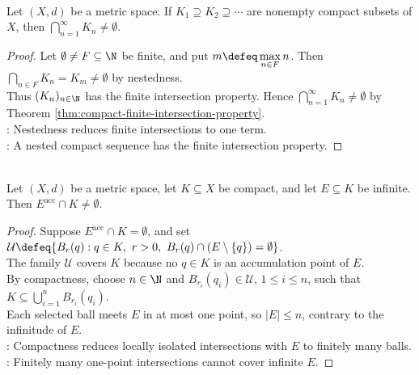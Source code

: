 \begin{corollary} \label{cor:nested-nonempty-compact-intersection} \\
Let $(X,d)$ be a metric space. If $K_1\supseteq K_2\supseteq\cdots$ are nonempty compact subsets of $X$, then $\bigcap\limits_{n=1}^{\infty}K_n\ne\emptyset$.
\begin{proof}
Let $\emptyset\ne F\subseteq\N$ be finite, and put $m\defeq\max\limits_{n\in F}n$. Then $\bigcap\limits_{n\in F}K_n=K_m\ne\emptyset$ by nestedness.\\
Thus $(K_n)_{n\in\N}$ has the finite intersection property. Hence $\bigcap\limits_{n=1}^{\infty}K_n\ne\emptyset$ by Theorem \ref{thm:compact-finite-intersection-property}.\\
: Nestedness reduces finite intersections to one term.\\
: A nested compact sequence has the finite intersection property.
\end{proof}
\end{corollary}

\begin{theorem} \label{thm:infinite-subset-of-compact-has-limit-point} \\
Let $(X,d)$ be a metric space, let $K\subseteq X$ be compact, and let $E\subseteq K$ be infinite. Then $E^{\operatorname{acc}}\cap K\ne\emptyset$.
\begin{proof}
Suppose $E^{\operatorname{acc}}\cap K=\emptyset$, and set $\mathcal{U}\defeq\{B_r(q):q\in K,\ r>0,\ B_r(q)\cap(E\setminus\{q\})=\emptyset\}$.\\
The family $\mathcal{U}$ covers $K$ because no $q\in K$ is an accumulation point of $E$.\\
By compactness, choose $n\in\N$ and $B_{r_i}(q_i)\in\mathcal{U}$, $1\leq i\leq n$, such that $K\subseteq\bigcup\limits_{i=1}^{n}B_{r_i}(q_i)$.\\
Each selected ball meets $E$ in at most one point, so $|E|\leq n$, contrary to the infinitude of $E$.\\
: Compactness reduces locally isolated intersections with $E$ to finitely many balls.\\
: Finitely many one-point intersections cannot cover infinite $E$.
\end{proof}
\end{theorem}

